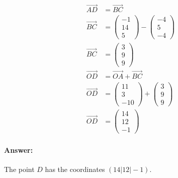 \documentclass{article}
\begin{document}
\begin{align}
    \vec{AD} &= \vec{BC} \\
    \vec{BC} &= \begin{pmatrix}
        -1 \\
        14\\ 
        5    
    \end{pmatrix} -    
    \begin{pmatrix}
        -4 \\ 
         5 \\ 
        -4
    \end{pmatrix} \\
    \vec{BC} &= \begin{pmatrix}
        3 \\ 
        9 \\ 
        9
    \end{pmatrix} \\
    \vec{OD} &= \vec{OA} + \vec{BC} \\
    \vec{OD} &= \begin{pmatrix}
        11 \\ 
        3 \\ 
        -10
    \end{pmatrix} + 
    \begin{pmatrix}
        3 \\ 
        9 \\ 
        9
    \end{pmatrix} \\
    \vec{OD} &= \begin{pmatrix}
        14 \\ 
        12 \\
        -1
    \end{pmatrix}
\end{align}

\paragraph{Answer:}
The point $D$ has the coordinates $(14|12|-1)$.
\end{document}
